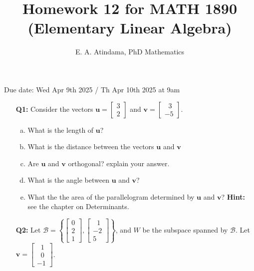 \documentclass[a4paper,11pt,reqno]{amsart}
\title[MATH 1890 (Elementary Linear Algebra)]{Homework 12 for MATH 1890 (Elementary Linear Algebra)}
\author[Emmanuel Atindama]{E. A. Atindama, PhD Mathematics}
\numberwithin{equation}{section}
\begin{document}
\maketitle
Due date: Wed Apr 9th 2025 / Th Apr 10th 2025 at 9am
\vspace{0.5cm}

\begin{enumerate}
    \item[\textbf{Q1:}] Consider  the vectors \(\mathbf{u} =\begin{bmatrix} 3 \\ 2 \end{bmatrix}\) and 
    \(\mathbf{v} =\begin{bmatrix} \;\;3 \\ -5 \end{bmatrix}\).
    \vspace{0.25cm}
    
    \begin{enumerate}[a)]
        \item What is the length of \(\mathbf{u}\)?
        \item What is the distance between the vectors \(\mathbf{u}\) and \(\mathbf{v}\)
        \item Are \(\mathbf{u}\) and \(\mathbf{v}\) orthogonal? explain your answer.
        \item What is the angle between \(\mathbf{u}\) and \(\mathbf{v}\)?
        \item What the the area of the parallelogram determined by \(\mathbf{u}\) and \(\mathbf{v}\)? 
        \textbf{Hint: }see the chapter on Determinants.
    \end{enumerate}
    
    
    \vspace{0.3cm}

    \item[\textbf{Q2:}] Let \(\mathcal{B} =\left\{\begin{bmatrix} 0 \\ 2 \\ 1\end{bmatrix}, \begin{bmatrix} \;\;1 \\-2\\5 \end{bmatrix} \right\}\), and \(W\) be the subspace spanned by \(\mathcal{B}\).
    Let \(\mathbf{v} = \begin{bmatrix} \;\;1\\\;\;0 \\-1 \end{bmatrix}\).
    \vspace{0.25cm}
    

\end{enumerate}
\end{document}
